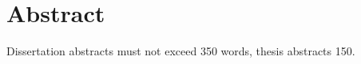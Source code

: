 \chapter*{Abstract}{
\pagestyle{plain} %



Dissertation abstracts must not exceed 350 words, thesis abstracts
150\cite{cwru_grad_studies}.

\lipsum[1]



\thispagestyle{plain} %
}
